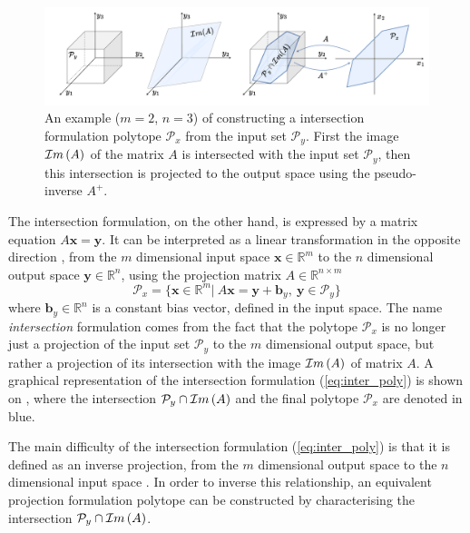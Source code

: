 \begin{figure}[!h]
    \centering
    \includegraphics[width=\linewidth]{Chapters/imgs/image_intersection_poly_all.pdf}
    \caption{An example ($m=2$, $n=3$) of constructing a intersection formulation polytope $\mathcal{P}_x$ from the input set $\mathcal{P}_y$. First the image $\mathcal{I}m\left(A\right)$ of the matrix $A$ is intersected with the input set $\mathcal{P}_y$, then this intersection is projected to the output space using the pseudo-inverse $A^+$. }
    \label{fig:inter_image_poly}
\end{figure}
The intersection formulation, on the other hand, is expressed by a matrix equation $A\bm{x}=\bm{y}$. It can be interpreted as a linear transformation in the opposite direction \cite{LARSON2013}, from the $m$ dimensional input space $\bm{x}\in\mathbb{R}^m$ to the $n$ dimensional output space $\bm{y}\in\mathbb{R}^n$, using the projection matrix $A\in \mathbb{R}^{n\times m }$
\begin{equation}
    \mathcal{P}_x=\{\bm{x} \in \mathbb{R}^m|~ A\bm{x} = \bm{y}+ \bm{b}_y,~ \bm{y} \in \mathcal{P}_y\}
    \label{eq:inter_poly}
\end{equation}
where $\bm{b}_y \in \mathbb{R}^n$ is a constant bias vector, defined in the input space. The name \textit{intersection} formulation comes from the fact that the polytope $\mathcal{P}_x$ is no longer just a projection of the input set $\mathcal{P}_y$ to the $m$ dimensional output space, but rather a projection of its intersection with the image $\mathcal{I}m\left(A\right)$ of matrix $A$. 
A graphical representation of the intersection formulation (\ref{eq:inter_poly}) is shown on , where the intersection $\mathcal{P}_y\cap \mathcal{I}m\left(A\right)$ and the final polytope $\mathcal{P}_x$ are denoted in blue.

The main difficulty of the intersection formulation (\ref{eq:inter_poly}) is that it is defined as an inverse projection, from the $m$ dimensional output space to the $n$ dimensional input space \cite{LARSON2013}. In order to inverse this relationship, an equivalent projection formulation polytope can be constructed by characterising the intersection $\mathcal{P}_y\cap \mathcal{I}m\left(A\right)$. 

